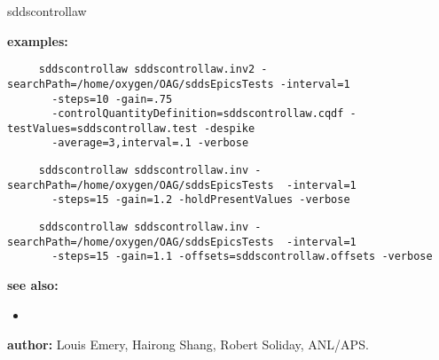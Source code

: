 \begin{sddsprog}{sddscontrollaw}
\item \textbf{examples:}
     \begin{verbatim}
     sddscontrollaw sddscontrollaw.inv2 -searchPath=/home/oxygen/OAG/sddsEpicsTests -interval=1 
       -steps=10 -gain=.75 
       -controlQuantityDefinition=sddscontrollaw.cqdf -testValues=sddscontrollaw.test -despike 
       -average=3,interval=.1 -verbose
     \end{verbatim}
     \begin{verbatim}
     sddscontrollaw sddscontrollaw.inv -searchPath=/home/oxygen/OAG/sddsEpicsTests  -interval=1 
       -steps=15 -gain=1.2 -holdPresentValues -verbose
     \end{verbatim}
     \begin{verbatim}
     sddscontrollaw sddscontrollaw.inv -searchPath=/home/oxygen/OAG/sddsEpicsTests  -interval=1 
       -steps=15 -gain=1.1 -offsets=sddscontrollaw.offsets -verbose
     \end{verbatim}
\item \textbf{see also:}

\begin{itemize}
  \item {}
\end{itemize}
\item \textbf{author:} Louis Emery, Hairong Shang, Robert Soliday, ANL/APS.
\end{sddsprog}
